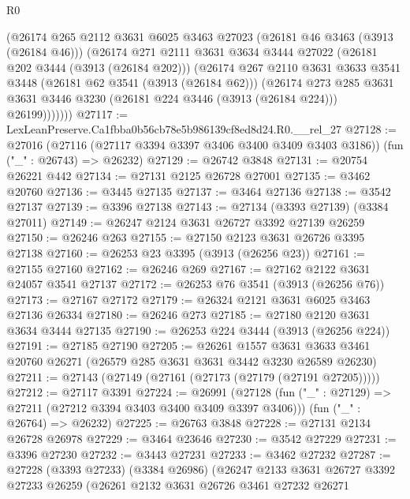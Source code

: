 \begin{lexlean}{R0}
\begin{coremodule}
          (@26174
            @265
            @2112
            @3631
            @6025
            @3463
            @27023
            (@26181 @46 @3463 (@3913 (@26184 @46)))
            (@26174
              @271
              @2111
              @3631
              @3634
              @3444
              @27022
              (@26181 @202 @3444 (@3913 (@26184 @202)))
              (@26174
                @267
                @2110
                @3631
                @3633
                @3541
                @3448
                (@26181 @62 @3541 (@3913 (@26184 @62)))
                (@26174
                  @273
                  @285
                  @3631
                  @3631
                  @3446
                  @3230
                  (@26181 @224 @3446 (@3913 (@26184 @224)))
                  @26199)))))))
@27117 := LexLeanPreserve.Ca1fbba0b56cb78e5b986139cf8ed8d24.R0.__rel_27
@27128 := @27016
    (@27116 (@27117 @3394 @3397 @3406 @3400 @3409 @3403 @3186))
    (fun ("_" : @26743) => @26232)
@27129 := @26742 @3848
@27131 := @20754 @26221 @442
@27134 := @27131 @2125 @26728 @27001
@27135 := @3462 @20760
@27136 := @3445 @27135
@27137 := @3464 @27136
@27138 := @3542 @27137
@27139 := @3396 @27138
@27143 := @27134 (@3393 @27139) (@3384 @27011)
@27149 := @26247 @2124 @3631 @26727 @3392 @27139 @26259
@27150 := @26246 @263
@27155 := @27150 @2123 @3631 @26726 @3395 @27138
@27160 := @26253 @23 @3395 (@3913 (@26256 @23))
@27161 := @27155 @27160
@27162 := @26246 @269
@27167 := @27162 @2122 @3631 @24057 @3541 @27137
@27172 := @26253 @76 @3541 (@3913 (@26256 @76))
@27173 := @27167 @27172
@27179 := @26324 @2121 @3631 @6025 @3463 @27136 @26334
@27180 := @26246 @273
@27185 := @27180 @2120 @3631 @3634 @3444 @27135
@27190 := @26253 @224 @3444 (@3913 (@26256 @224))
@27191 := @27185 @27190
@27205 := @26261
    @1557
    @3631
    @3633
    @3461
    @20760
    @26271
    (@26579 @285 @3631 @3631 @3442 @3230 @26589 @26230)
@27211 := @27143 (@27149 (@27161 (@27173 (@27179 (@27191 @27205)))))
@27212 := @27117 @3391
@27224 := @26991
    (@27128 (fun ("_" : @27129) => @27211 (@27212 @3394 @3403 @3400 @3409 @3397 @3406)))
    (fun ("_" : @26764) => @26232)
@27225 := @26763 @3848
@27228 := @27131 @2134 @26728 @26978
@27229 := @3464 @23646
@27230 := @3542 @27229
@27231 := @3396 @27230
@27232 := @3443 @27231
@27233 := @3462 @27232
@27287 := @27228
    (@3393 @27233)
    (@3384 @26986)
    (@26247
      @2133
      @3631
      @26727
      @3392
      @27233
      @26259
      (@26261
        @2132
        @3631
        @26726
        @3461
        @27232
        @26271

\end{coremodule}
\end{lexlean}
